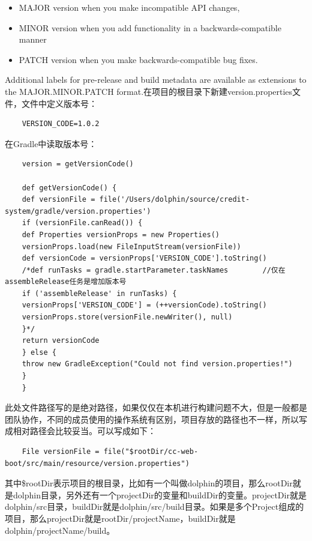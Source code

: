 \documentclass[11pt,fleqn]{book}
\numberwithin{dummy}{section}
\theoremstyle{ocrenumbox}
\theoremstyle{blacknumex}
\theoremstyle{blacknumbox}
\theoremstyle{ocrenum}
\begin{document}
	\begin{itemize}
		\item{MAJOR version when you make incompatible API changes,}
		\item{MINOR version when you add functionality in a backwards-compatible manner}
		\item{PATCH version when you make backwards-compatible bug fixes.}
	\end{itemize}
	
	Additional labels for pre-release and build metadata are available as extensions to the MAJOR.MINOR.PATCH format.在项目的根目录下新建version.properties文件，文件中定义版本号：
	
	\begin{lstlisting}
	VERSION_CODE=1.0.2
	\end{lstlisting}
	
	在Gradle中读取版本号：
	
	\begin{lstlisting}
	version = getVersionCode()
	
	def getVersionCode() {
	def versionFile = file('/Users/dolphin/source/credit-system/gradle/version.properties')
	if (versionFile.canRead()) {
	def Properties versionProps = new Properties()
	versionProps.load(new FileInputStream(versionFile))
	def versionCode = versionProps['VERSION_CODE'].toString()
	/*def runTasks = gradle.startParameter.taskNames        //仅在assembleRelease任务是增加版本号
	if ('assembleRelease' in runTasks) {
	versionProps['VERSION_CODE'] = (++versionCode).toString()
	versionProps.store(versionFile.newWriter(), null)
	}*/
	return versionCode
	} else {
	throw new GradleException("Could not find version.properties!")
	}
	}
	\end{lstlisting}
	
	此处文件路径写的是绝对路径，如果仅仅在本机进行构建问题不大，但是一般都是团队协作，不同的成员使用的操作系统有区别，项目存放的路径也不一样，所以写成相对路径会比较妥当。可以写成如下：
	
	\begin{lstlisting}
	File versionFile = file("$rootDir/cc-web-boot/src/main/resource/version.properties")
	\end{lstlisting}
	
	其中\$rootDir表示项目的根目录，比如有一个叫做dolphin的项目，那么rootDir就是dolphin目录，另外还有一个projectDir的变量和buildDir的变量。projectDir就是dolphin/src目录，buildDir就是dolphin/src/build目录。如果是多个Project组成的项目，那么projectDir就是rootDir/projectName，buildDir就是dolphin/projectName/build。
\end{document}
